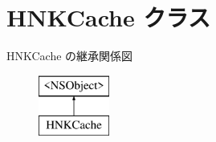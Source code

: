 \hypertarget{interface_h_n_k_cache}{}\section{H\+N\+K\+Cache クラス}
\label{interface_h_n_k_cache}
H\+N\+K\+Cache の継承関係図\begin{figure}[H]
\begin{center}
\leavevmode
\includegraphics[height=2.000000cm]{interface_h_n_k_cache}
\end{center}
\end{figure}
